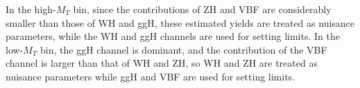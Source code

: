 In the high-$M_{T}$ bin, since the contributions of ZH and VBF are considerably smaller than those of WH and ggH, these estimated yields are treated as nuisance parameters, while the WH and ggH channels are used for setting limits. In the low-$M_{T}$ bin, the ggH channel is dominant, and the contribution of the VBF channel is larger than that of WH and ZH, so WH and ZH are treated as nuisance parameters while ggH and VBF are used for setting limits.